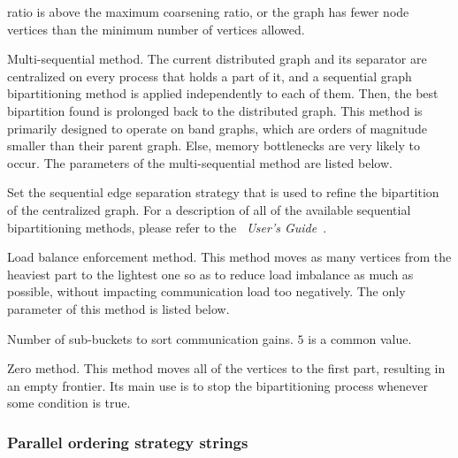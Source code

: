 \begin{itemize}
\begin{itemize}
\begin{itemize}
ratio is above the maximum coarsening ratio, or the graph
has fewer node vertices than the minimum number of vertices allowed.
\end{itemize}
\iteme[{\tt q}]
Multi-sequential method. The current distributed graph and its
separator are centralized on every process that holds a part of it, and
a sequential graph bipartitioning method is applied independently to each
of them. Then, the best bipartition found is prolonged back to the
distributed graph. This method is primarily designed to operate on
band graphs, which are orders of magnitude smaller than their parent
graph. Else, memory bottlenecks are very likely to occur.
The parameters of the multi-sequential method are listed below.
\begin{itemize}
\iteme[{\tt strat=}{\it strat}]
Set the sequential edge separation strategy that is used to refine
the bipartition of the centralized graph. For a description of all of
the available sequential bipartitioning methods, please refer to the
{\it\scotch\ User's Guide}~\scotchcitesuser.
\end{itemize}
\iteme[{\tt x}]
Load balance enforcement method. This method moves as many vertices
from the heaviest part to the lightest one so as to reduce load
imbalance as much as possible, without impacting communication load
too negatively. The only parameter of this method is listed below.
\begin{itemize}
\iteme[{\tt sbbt=}{\it nbr}]
Number of sub-buckets to sort communication gains. $5$ is a common
value.
\end{itemize}
\iteme[{\tt z}]
Zero method. This method moves all of the vertices to the first
part, resulting in an empty frontier. Its main use is to stop the
bipartitioning process whenever some condition is true.
\end{itemize}
\end{itemize}

\subsubsection{Parallel ordering strategy strings}
\label{sec-lib-format-strat-pord}

